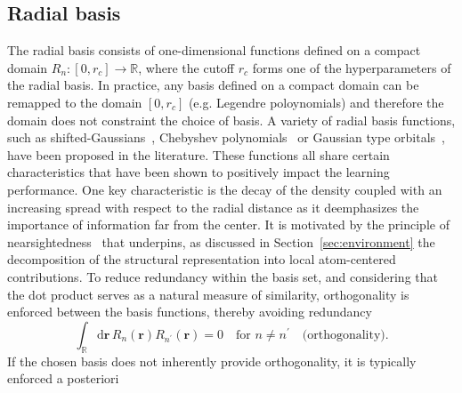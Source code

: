 \subsection{Radial basis}
\label{sec:radial_basis_set}
The radial basis consists of one-dimensional functions defined on a compact domain $R_n:[0, r_c]\rightarrow\mathbb{R}$, where the cutoff $r_c$ forms one of the hyperparameters of the radial basis.
In practice, any basis defined on a compact domain can be remapped to the domain $[0, r_c]$ (e.g. Legendre poloynomials) and therefore the domain does not constraint the choice of basis.
A variety of radial basis functions, such as shifted-Gaussians~\cite{bart+13prb}, Chebyshev polynomials~\cite{shapeev2016moment,drautz2019atomic} or Gaussian type orbitals~\cite{musil2021efficient}, have been proposed in the literature.
These functions all share certain characteristics that have been shown to positively impact the learning performance. 
One key characteristic is the decay of the density   
 coupled with an increasing spread with respect to the radial distance as it deemphasizes the importance of information far from the center.
 It is motivated by the principle of nearsightedness~\cite{prodan2005nearsightedness} that underpins, as discussed in Section~\ref{sec:environment} the decomposition of the structural representation into local atom-centered contributions.
To reduce redundancy within the basis set, and considering that the dot product serves as a natural measure of similarity, orthogonality is enforced between the basis functions, thereby avoiding redundancy
\begin{equation}
  \int_\mathbb{R}\mathrm{d}\mathbf{r}\,R_n(\mathbf{r})R_{n^\prime}(\mathbf{r}) = 0\quad\textrm{for }n\neq n^\prime\quad \text{(orthogonality)}.
\end{equation}
If the chosen basis does not inherently provide orthogonality, it is typically enforced a posteriori %
